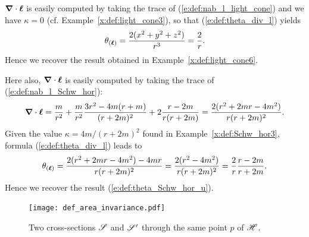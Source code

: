 {\begin{example}  \label{x:def:light_cone7}
$\bm{\nabla}\cdot\bm{\ell}$ is easily computed by taking the trace of
(\ref{e:def:nab_l_light_cone}) and we have $\kappa=0$ (cf. Example~\ref{x:def:light_cone3}),
so that (\ref{e:def:theta_div_l}) yields
\[
    \theta_{(\bm{\ell})} = \frac{2(x^2+y^2+z^2)}{r^3} = \frac{2}{r} .
\]
Hence we recover the result obtained in Example~\ref{x:def:light_cone6}.
\end{example}

\begin{example} \label{x:def:Schw_hor7}
Here also, $\bm{\nabla}\cdot\bm{\ell}$ is easily computed by taking the trace of
(\ref{e:def:nab_l_Schw_hor}):
\[
    \bm{\nabla}\cdot\bm{\ell} = \frac{m}{r^2} + \frac{m}{r^2} \frac{3r^2-4m(r+m)}{(r+2m)^2}
        + 2\frac{r-2m}{r(r+2m)} =
    \frac{2(r^2 + 2mr - 4m^2)}{r(r+2m)^2} .
\]
Given the value $\kappa= 4m/(r+2m)^2$ found in Example~\ref{x:def:Schw_hor3},
formula (\ref{e:def:theta_div_l}) leads to
\[
     \theta_{(\bm{\ell})} = \frac{2(r^2 + 2mr - 4m^2) - 4mr}{r(r+2m)^2} = \frac{2(r^2-4m^2)}{r(r+2m)^2}
     = \frac{2}{r} \frac{r-2m}{r+2m} .
\]
Hence we recover the result (\ref{e:def:theta_Schw_hor_u}).
\end{example}

\begin{figure}
\centerline{\texttt{[image: def\_area\_invariance.pdf]}}
\caption[]{\label{f:def:two_cross_sections} \footnotesize
Two cross-sections $\mathscr{S}$ and $\mathscr{S}'$ through the same point $p$ of $\mathscr{H}$.}
\end{figure}



}
